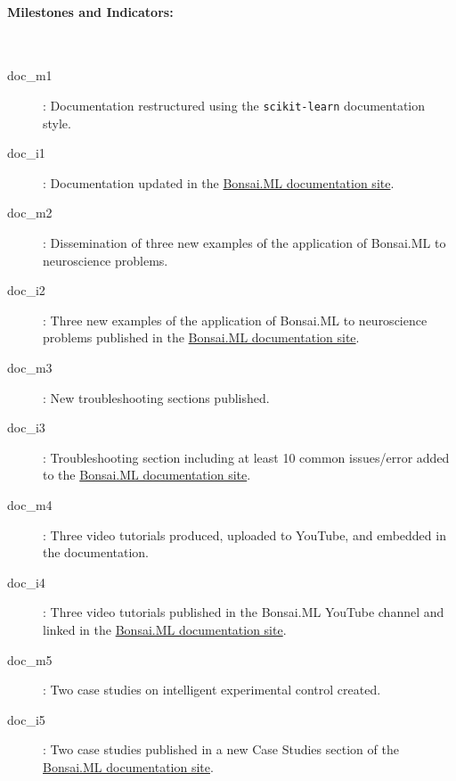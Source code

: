\paragraph{Milestones and Indicators:}\mbox{}\\

\begin{description}

    \item[doc\_m1]: Documentation restructured using the \texttt{scikit-learn}
        documentation style.

    \item[doc\_i1]: Documentation updated in the
        \href{https://bonsai-rx.org/machinelearning/}{Bonsai.ML documentation site}.

    \item[doc\_m2]: Dissemination of three new examples of the application of Bonsai.ML to
        neuroscience problems.

    \item[doc\_i2]: Three new examples of the application of Bonsai.ML
        to neuroscience problems published in the
        \href{https://bonsai-rx.org/machinelearning/}{Bonsai.ML documentation site}.

    \item[doc\_m3]: New troubleshooting sections published.

    \item[doc\_i3]: Troubleshooting section including at least 10 common
        issues/error added to the
        \href{https://bonsai-rx.org/machinelearning/}{Bonsai.ML documentation site}.

    \item[doc\_m4]: Three video tutorials produced, uploaded to YouTube, and
        embedded in the documentation.

    \item[doc\_i4]: Three video tutorials published in the Bonsai.ML YouTube
        channel and linked in the
        \href{https://bonsai-rx.org/machinelearning/}{Bonsai.ML documentation site}.

    \item[doc\_m5]: Two case studies on intelligent experimental control
        created.

    \item[doc\_i5]: Two case studies published in a new Case Studies section of
        the
        \href{https://bonsai-rx.org/machinelearning/}{Bonsai.ML documentation site}.

\end{description}

